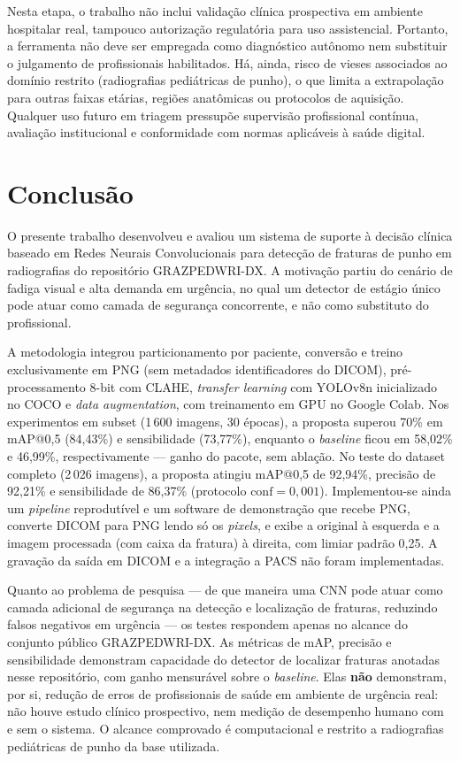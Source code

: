 \documentclass[12pt,oneside,a4paper,chapter=TITLE,section=TITLE,sumario=tradicional]{abntex2}
\begin{document}
Nesta etapa, o trabalho não inclui validação clínica prospectiva em ambiente hospitalar real, tampouco autorização regulatória para uso assistencial. Portanto, a ferramenta não deve ser empregada como diagnóstico autônomo nem substituir o julgamento de profissionais habilitados. Há, ainda, risco de vieses associados ao domínio restrito (radiografias pediátricas de punho), o que limita a extrapolação para outras faixas etárias, regiões anatômicas ou protocolos de aquisição. Qualquer uso futuro em triagem pressupõe supervisão profissional contínua, avaliação institucional e conformidade com normas aplicáveis à saúde digital.

\chapter{Conclusão}
\label{cap:conclusao}

O presente trabalho desenvolveu e avaliou um sistema de suporte à decisão clínica baseado em Redes Neurais Convolucionais para detecção de fraturas de punho em radiografias do repositório GRAZPEDWRI-DX. A motivação partiu do cenário de fadiga visual e alta demanda em urgência, no qual um detector de estágio único pode atuar como camada de segurança concorrente, e não como substituto do profissional.

A metodologia integrou particionamento por paciente, conversão e treino exclusivamente em PNG (sem metadados identificadores do DICOM), pré-processamento 8-bit com CLAHE, \textit{transfer learning} com YOLOv8n inicializado no COCO \cite{jocher2023ultralytics} e \textit{data augmentation}, com treinamento em GPU no Google Colab. Nos experimentos em subset (1\,600 imagens, 30 épocas), a proposta superou 70\% em mAP@0,5 (84,43\%) e sensibilidade (73,77\%), enquanto o \textit{baseline} ficou em 58,02\% e 46,99\%, respectivamente --- ganho do pacote, sem ablação. No teste do dataset completo (2\,026 imagens), a proposta atingiu mAP@0,5 de 92,94\%, precisão de 92,21\% e sensibilidade de 86,37\% (protocolo $\mathrm{conf}=0{,}001$). Implementou-se ainda um \textit{pipeline} reprodutível e um software de demonstração que recebe PNG, converte DICOM para PNG lendo só os \textit{pixels}, e exibe a original à esquerda e a imagem processada (com caixa da fratura) à direita, com limiar padrão 0,25. A gravação da saída em DICOM e a integração a PACS não foram implementadas.

Quanto ao problema de pesquisa --- de que maneira uma CNN pode atuar como camada adicional de segurança na detecção e localização de fraturas, reduzindo falsos negativos em urgência --- os testes respondem apenas no alcance do conjunto público GRAZPEDWRI-DX. As métricas de mAP, precisão e sensibilidade demonstram capacidade do detector de localizar fraturas anotadas nesse repositório, com ganho mensurável sobre o \textit{baseline}. Elas \textbf{não} demonstram, por si, redução de erros de profissionais de saúde em ambiente de urgência real: não houve estudo clínico prospectivo, nem medição de desempenho humano com e sem o sistema. O alcance comprovado é computacional e restrito a radiografias pediátricas de punho da base utilizada.
\end{document}
